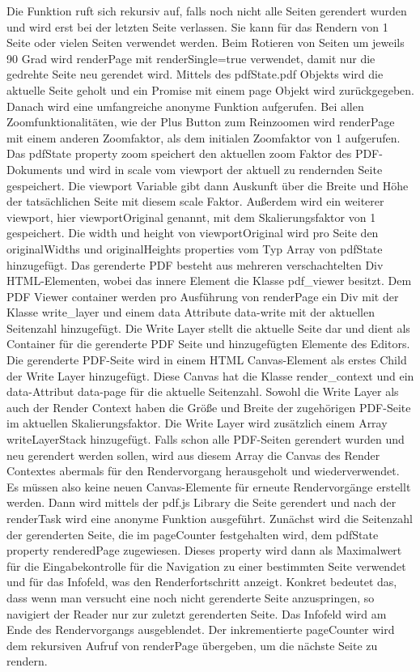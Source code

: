 Die Funktion ruft sich rekursiv auf, falls noch nicht alle Seiten gerendert wurden und wird erst bei der letzten Seite verlassen. Sie kann für das Rendern von 1 Seite oder vielen Seiten verwendet werden. Beim Rotieren von Seiten um jeweils 90 Grad wird renderPage mit renderSingle=true verwendet, damit nur die gedrehte Seite neu gerendet wird. Mittels des pdfState.pdf Objekts wird die aktuelle Seite geholt und ein Promise mit einem page Objekt wird zurückgegeben. Danach wird eine umfangreiche anonyme Funktion aufgerufen. Bei allen Zoomfunktionalitäten, wie der Plus Button zum Reinzoomen wird renderPage mit einem anderen Zoomfaktor, als dem initialen Zoomfaktor von 1 aufgerufen. Das pdfState property zoom speichert den aktuellen zoom Faktor des PDF-Dokuments und wird in scale vom viewport der aktuell zu rendernden Seite gespeichert. Die viewport Variable gibt dann Auskunft über die Breite und Höhe der tatsächlichen Seite mit diesem scale Faktor. Außerdem wird ein weiterer viewport, hier viewportOriginal genannt, mit dem Skalierungsfaktor von 1 gespeichert. Die width und height von viewportOriginal wird pro Seite den originalWidths und originalHeights properties vom Typ Array von pdfState hinzugefügt. Das gerenderte PDF besteht aus mehreren verschachtelten Div HTML-Elementen, wobei das innere Element die Klasse pdf\_viewer besitzt. Dem PDF Viewer container werden pro Ausführung von renderPage ein Div mit der Klasse write\_layer und einem data Attribute data-write mit der aktuellen Seitenzahl hinzugefügt. Die Write Layer stellt die aktuelle Seite dar und dient als Container für die gerenderte PDF Seite und hinzugefügten Elemente des Editors. Die gerenderte PDF-Seite wird in einem HTML Canvas-Element als erstes Child der Write Layer hinzugefügt. Diese Canvas hat die Klasse render\_context und ein data-Attribut data-page für die aktuelle Seitenzahl. Sowohl die Write Layer als auch der Render Context haben die Größe und Breite der zugehörigen PDF-Seite im aktuellen Skalierungsfaktor. Die Write Layer wird zusätzlich einem Array writeLayerStack hinzugefügt. Falls schon alle PDF-Seiten gerendert wurden und neu gerendert werden sollen, wird aus diesem Array die Canvas des Render Contextes abermals für den Rendervorgang herausgeholt und wiederverwendet. Es müssen also keine neuen Canvas-Elemente für erneute Rendervorgänge erstellt werden. Dann wird mittels der pdf.js Library die Seite gerendert und nach der renderTask wird eine anonyme Funktion ausgeführt. Zunächst wird die Seitenzahl der gerenderten Seite, die im pageCounter festgehalten wird, dem pdfState property renderedPage zugewiesen. Dieses property wird dann als Maximalwert für die Eingabekontrolle für die Navigation zu einer bestimmten Seite verwendet und für das Infofeld, was den Renderfortschritt anzeigt. Konkret bedeutet das, dass wenn man versucht eine noch nicht gerenderte Seite anzuspringen, so navigiert der Reader nur zur zuletzt gerenderten Seite. Das Infofeld wird am Ende des Rendervorgangs ausgeblendet. Der inkrementierte pageCounter wird dem rekursiven Aufruf von renderPage übergeben, um die nächste Seite zu rendern. 

